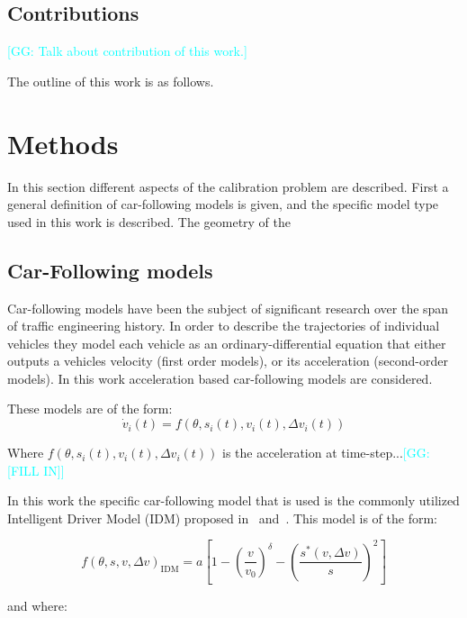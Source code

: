\documentclass[english,titlepage,oneside,12pt]{article}
\newcommand{\kibitz}[2]{\ifnum\Comments=1\textcolor{#1}{#2}\fi}
\newcommand{\George}[1]{\kibitz{cyan}      {[GG: #1]}}
\begin{document}
\subsection{Contributions}\label{sec:Contributions}

\George{Talk about contribution of this work.}

The outline of this work is as follows.

\section{Methods}\label{Methods}

In this section different aspects of the calibration problem are described. First a general definition of car-following models is given, and the specific model type used in this work is described. The geometry of the 


\subsection{Car-Following models}
Car-following models have been the subject of significant research over the span of traffic engineering history. In order to describe the trajectories of individual vehicles they model each vehicle as an ordinary-differential equation that either outputs a vehicles velocity (first order models), or its acceleration (second-order models). In this work acceleration based car-following models are considered.

These models are of the form:
\begin{equation}\label{eq:cfmodel}
    \dot{v}_{i}(t) = f(\theta,s_{i}(t), v_{i}(t), \Delta v_{i}(t))
\end{equation}

Where $f(\theta,s_{i}(t), v_{i}(t), \Delta v_{i}(t))$ is the acceleration at time-step...\George{[FILL IN]}

In this work the specific car-following model that is used is the commonly utilized Intelligent Driver Model (IDM) proposed in~\cite{treiber2000congested} and~\cite{kesting2010enhanced}. This model is of the form:

\begin{equation}\label{eq:IDM_Equation}
    f(\theta,s,v,\Delta v)_{\text{IDM}} =a\left[1-\left(\frac{v}{v_{0}}\right)^{\delta}-\left(\frac{s^{*}\left(v,\Delta v\right)}{s}\right)^{2}\right]
\end{equation}

and where:
\end{document}
